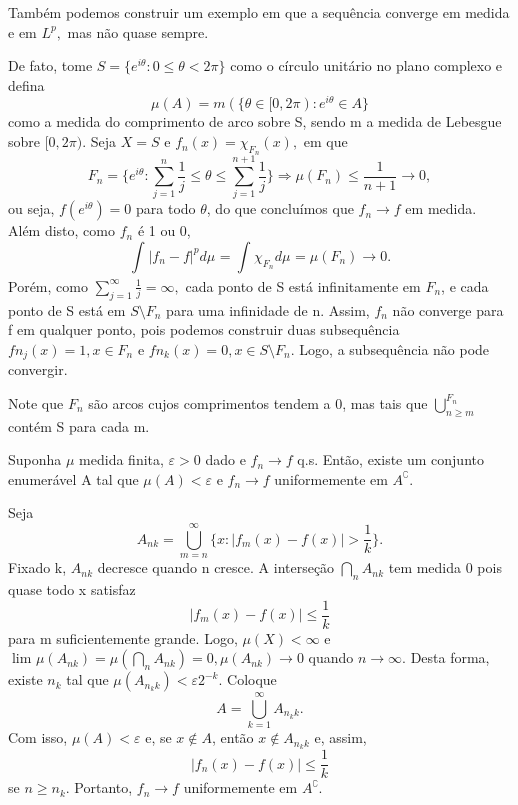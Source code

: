 \documentclass[MeasureTheory/measure_theory.tex]{subfiles}
\begin{document}
\begin{example}
	Também podemos construir um exemplo em que a sequência converge em medida e em \(L^{p},\) mas não quase sempre.

	De fato, tome \(S = \{e^{i\theta }: 0 \leq \theta < 2\pi \}\) como o círculo unitário no plano complexo e defina
	\[
		\mu (A) = m(\{\theta \in [0, 2\pi ): e^{i\theta }\in A\}
	\]
	como a medida do comprimento de arco sobre S, sendo m a medida de Lebesgue sobre \([0, 2\pi ).\) Seja \(X = S\) e \(f_{n}(x) = \chi_{F_{n}}(x),\) em que
	\[
		F_{n} = \biggl\{e^{i\theta }: \sum\limits_{j=1}^{n}\frac{1}{j} \leq \theta \leq \sum\limits_{j=1}^{n+1}\frac{1}{j}\biggr\} \Rightarrow \mu (F_{n}) \leq \frac{1}{n+1}\to 0,
	\]
	ou seja, \(f(e^{i\theta }) = 0\) para todo \(\theta \), do que concluímos que \(f_{n}\to f\) em medida. Além disto, como \(f_{n}\) é 1 ou 0,
	\[
		\int_{}|f_{n}-f|^{p} d\mu_{} = \int_{}\chi_{F_{n}} d\mu_{} = \mu (F_{n})\to 0.
	\]
	Porém, como \(\sum\limits_{j=1}^{\infty}\frac{1}{j} = \infty,\) cada ponto de S está infinitamente em \(F_{n}\), e cada ponto de S está em \(S\setminus{F_{n}}\) para uma infinidade de n. Assim,
	\(f_{n}\) não converge para f em qualquer ponto, pois podemos construir duas subsequência \(fn_{j}(x) = 1, x\in F_{n}\) e \(fn_{k}(x) = 0, x\in S\setminus{F_{n}}.\) Logo, a subsequência não pode convergir.

	Note que \(F_{n}\) são arcos cujos comprimentos tendem a 0, mas tais que \(\bigcup_{n\geq m}^{F_{n}}\) contém S para cada m.
\end{example}
\hypertarget{egorov}{
	\begin{theorem*}
		Suponha \(\mu \) medida finita, \(\varepsilon > 0\) dado e \(f_{n}\to f\) q.s. Então, existe um conjunto enumerável A tal que \(\mu (A) < \varepsilon \) e \(f_{n}\to f\) uniformemente em \(A ^{\complement}\).
	\end{theorem*}}
\begin{proof*}
	Seja
	\[
		A_{nk} = \bigcup_{m=n}^{\infty}\biggl\{x: |f_{m}(x) - f(x)| > \frac{1}{k}\biggr\}.
	\]
	Fixado k, \(A_{nk}\) decresce quando n cresce. A interseção \(\bigcap_{n}^{}A_{nk}\) tem medida 0 pois quase todo x satisfaz
	\[
		|f_{m}(x) - f(x)| \leq \frac{1}{k}
	\]
	para m suficientemente grande. Logo, \(\mu (X) < \infty\) e \(\lim_{} \mu (A_{nk}) = \mu (\bigcap_{n}^{}A_{nk}) = 0, \mu (A_{nk})\to 0\) quando \(n\to \infty\). Desta forma, existe \(n_{k}\) tal que
	\(\mu (A_{n_kk}) < \varepsilon 2^{-k}. \) Coloque
	\[
		A = \bigcup_{k=1}^{\infty}A_{n_kk}.
	\]
	Com isso, \(\mu (A) < \varepsilon \) e, se \(x\not\in A\), então \(x\not\in A_{n_{k}k}\) e, assim,
	\[
		|f_{n}(x) - f(x)| \leq \frac{1}{k}
	\]
	se \(n \geq n_{k}.\) Portanto, \(f_{n}\to f\) uniformemente em \(A ^{\complement}.\) \qedsymbol
\end{proof*}
\end{document}
